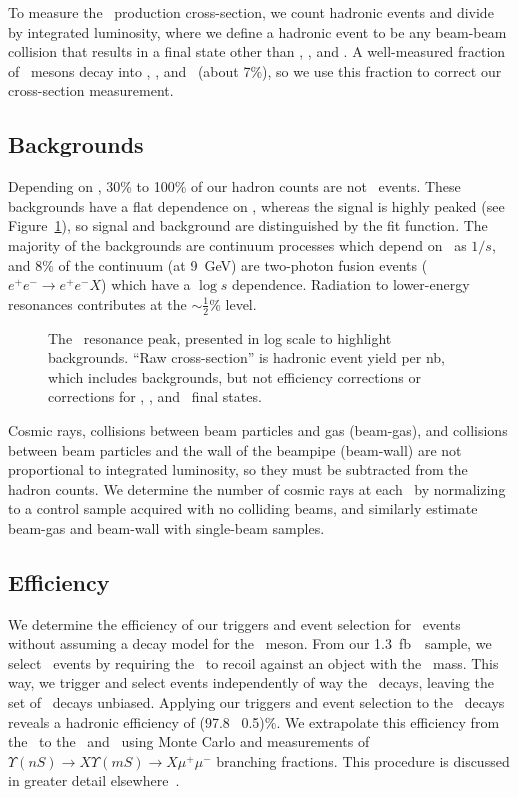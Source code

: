 \documentclass{ws-procs9x6}
\begin{document}
To measure the \ups\ production cross-section, we count hadronic
events and divide by integrated luminosity, where we define a hadronic
event to be any beam-beam collision that results in a final state
other than \ee, \mumu, and \tautau.  A well-measured
fraction\cite{istvan} of \ups\ mesons decay into \ee, \mumu, and
\tautau\ (about 7\%), so we use this fraction to correct our
cross-section measurement.

\subsection{Backgrounds}

Depending on \ecm, 30\% to 100\% of our hadron counts are not \ups\
events.  These backgrounds have a flat dependence on \ecm, whereas the
signal is highly peaked (see Figure~\ref{background}), so signal and
background are distinguished by the fit function.  The majority of the
backgrounds are continuum processes which depend on \ecm\ as $1/s$,
and 8\% of the continuum (at 9~GeV) are two-photon fusion events
($e^+e^- \to e^+e^- X$) which have a $\log s$ dependence.  Radiation
to lower-energy resonances contributes at the $\sim\frac{1}{2}$\%
level.

\begin{figure}
\centerline{\linewidth {}}
\caption{The \usss\ resonance peak, presented in log scale to
  highlight backgrounds.  ``Raw cross-section'' is hadronic event
  yield per nb\inv, which includes backgrounds, but not efficiency
  corrections or corrections for \ee, \mumu, and \tautau\ final
  states. \label{background}}
\end{figure}

Cosmic rays, collisions between beam particles and gas (beam-gas), and
collisions between beam particles and the wall of the beampipe
(beam-wall) are not proportional to integrated luminosity, so they
must be subtracted from the hadron counts.  We determine the number of
cosmic rays at each \ecm\ by normalizing to a control sample acquired
with no colliding beams, and similarly estimate beam-gas and beam-wall
with single-beam samples.

\subsection{Efficiency}

We determine the efficiency of our triggers and event selection for
\us\ events without assuming a decay model for the \ups\ meson.  From
our 1.3~fb\inv\ \uss\ sample, we select \twotoone\ events by requiring
the \pipi\ to recoil against an object with the \us\ mass.  This way,
we trigger and select events independently of way the \us\ decays,
leaving the set of \us\ decays unbiased.  Applying our triggers and event
selection to the \us\ decays reveals a hadronic efficiency of (97.8 \PM\
0.5)\%.  We extrapolate this efficiency from the \us\ to the \uss\ and
\usss\ using Monte Carlo and measurements of $\Upsilon(nS) \to X
\Upsilon(mS) \to X \mu^+\mu^-$ branching fractions.  This procedure is
discussed in greater detail elsewhere\cite{prl}\mbox{ }\cite{thesis}.
\end{document}
